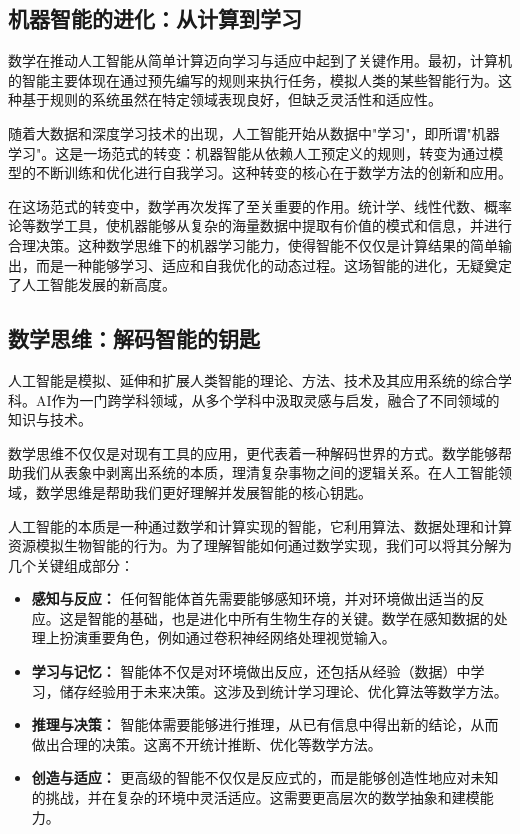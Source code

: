 \subsection*{机器智能的进化：从计算到学习}

数学在推动人工智能从简单计算迈向学习与适应中起到了关键作用。最初，计算机的智能主要体现在通过预先编写的规则来执行任务，模拟人类的某些智能行为。这种基于规则的系统虽然在特定领域表现良好，但缺乏灵活性和适应性。

随着大数据和深度学习技术的出现，人工智能开始从数据中"学习"，即所谓"机器学习"。这是一场范式的转变：机器智能从依赖人工预定义的规则，转变为通过模型的不断训练和优化进行自我学习。这种转变的核心在于数学方法的创新和应用。

在这场范式的转变中，数学再次发挥了至关重要的作用。统计学、线性代数、概率论等数学工具，使机器能够从复杂的海量数据中提取有价值的模式和信息，并进行合理决策。这种数学思维下的机器学习能力，使得智能不仅仅是计算结果的简单输出，而是一种能够学习、适应和自我优化的动态过程。这场智能的进化，无疑奠定了人工智能发展的新高度。

\subsection*{数学思维：解码智能的钥匙}

人工智能是模拟、延伸和扩展人类智能的理论、方法、技术及其应用系统的综合学科。AI作为一门跨学科领域，从多个学科中汲取灵感与启发，融合了不同领域的知识与技术。

数学思维不仅仅是对现有工具的应用，更代表着一种解码世界的方式。数学能够帮助我们从表象中剥离出系统的本质，理清复杂事物之间的逻辑关系。在人工智能领域，数学思维是帮助我们更好理解并发展智能的核心钥匙。

人工智能的本质是一种通过数学和计算实现的智能，它利用算法、数据处理和计算资源模拟生物智能的行为。为了理解智能如何通过数学实现，我们可以将其分解为几个关键组成部分：

\begin{itemize}
\item \textbf{感知与反应：} 任何智能体首先需要能够感知环境，并对环境做出适当的反应。这是智能的基础，也是进化中所有生物生存的关键。数学在感知数据的处理上扮演重要角色，例如通过卷积神经网络处理视觉输入。
\item \textbf{学习与记忆：} 智能体不仅是对环境做出反应，还包括从经验（数据）中学习，储存经验用于未来决策。这涉及到统计学习理论、优化算法等数学方法。
\item \textbf{推理与决策：} 智能体需要能够进行推理，从已有信息中得出新的结论，从而做出合理的决策。这离不开统计推断、优化等数学方法。
\item \textbf{创造与适应：} 更高级的智能不仅仅是反应式的，而是能够创造性地应对未知的挑战，并在复杂的环境中灵活适应。这需要更高层次的数学抽象和建模能力。
\end{itemize}

